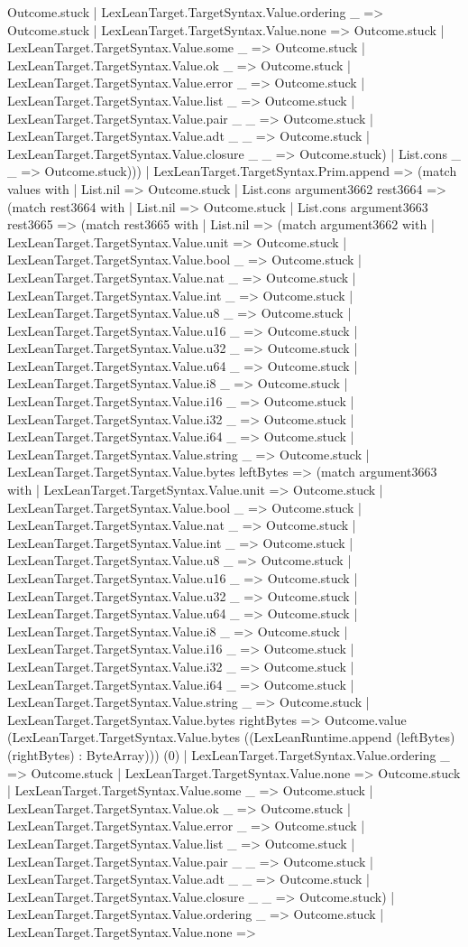 \documentclass[11pt]{article}
\begin{document}
Outcome.stuck | LexLeanTarget.TargetSyntax.Value.ordering \_ => Outcome.stuck | LexLeanTarget.TargetSyntax.Value.none => Outcome.stuck | LexLeanTarget.TargetSyntax.Value.some \_ => Outcome.stuck | LexLeanTarget.TargetSyntax.Value.ok \_ => Outcome.stuck | LexLeanTarget.TargetSyntax.Value.error \_ => Outcome.stuck | LexLeanTarget.TargetSyntax.Value.list \_ => Outcome.stuck | LexLeanTarget.TargetSyntax.Value.pair \_ \_ => Outcome.stuck | LexLeanTarget.TargetSyntax.Value.adt \_ \_ => Outcome.stuck | LexLeanTarget.TargetSyntax.Value.closure \_ \_ => Outcome.stuck) | List.cons \_ \_ => Outcome.stuck))) | LexLeanTarget.TargetSyntax.Prim.append => (match values with | List.nil => Outcome.stuck | List.cons argument3662 rest3664 => (match rest3664 with | List.nil => Outcome.stuck | List.cons argument3663 rest3665 => (match rest3665 with | List.nil => (match argument3662 with | LexLeanTarget.TargetSyntax.Value.unit => Outcome.stuck | LexLeanTarget.TargetSyntax.Value.bool \_ => Outcome.stuck | LexLeanTarget.TargetSyntax.Value.nat \_ => Outcome.stuck | LexLeanTarget.TargetSyntax.Value.int \_ => Outcome.stuck | LexLeanTarget.TargetSyntax.Value.u8 \_ => Outcome.stuck | LexLeanTarget.TargetSyntax.Value.u16 \_ => Outcome.stuck | LexLeanTarget.TargetSyntax.Value.u32 \_ => Outcome.stuck | LexLeanTarget.TargetSyntax.Value.u64 \_ => Outcome.stuck | LexLeanTarget.TargetSyntax.Value.i8 \_ => Outcome.stuck | LexLeanTarget.TargetSyntax.Value.i16 \_ => Outcome.stuck | LexLeanTarget.TargetSyntax.Value.i32 \_ => Outcome.stuck | LexLeanTarget.TargetSyntax.Value.i64 \_ => Outcome.stuck | LexLeanTarget.TargetSyntax.Value.string \_ => Outcome.stuck | LexLeanTarget.TargetSyntax.Value.bytes leftBytes => (match argument3663 with | LexLeanTarget.TargetSyntax.Value.unit => Outcome.stuck | LexLeanTarget.TargetSyntax.Value.bool \_ => Outcome.stuck | LexLeanTarget.TargetSyntax.Value.nat \_ => Outcome.stuck | LexLeanTarget.TargetSyntax.Value.int \_ => Outcome.stuck | LexLeanTarget.TargetSyntax.Value.u8 \_ => Outcome.stuck | LexLeanTarget.TargetSyntax.Value.u16 \_ => Outcome.stuck | LexLeanTarget.TargetSyntax.Value.u32 \_ => Outcome.stuck | LexLeanTarget.TargetSyntax.Value.u64 \_ => Outcome.stuck | LexLeanTarget.TargetSyntax.Value.i8 \_ => Outcome.stuck | LexLeanTarget.TargetSyntax.Value.i16 \_ => Outcome.stuck | LexLeanTarget.TargetSyntax.Value.i32 \_ => Outcome.stuck | LexLeanTarget.TargetSyntax.Value.i64 \_ => Outcome.stuck | LexLeanTarget.TargetSyntax.Value.string \_ => Outcome.stuck | LexLeanTarget.TargetSyntax.Value.bytes rightBytes => Outcome.value (LexLeanTarget.TargetSyntax.Value.bytes ((LexLeanRuntime.append (leftBytes) (rightBytes) : ByteArray))) (0) | LexLeanTarget.TargetSyntax.Value.ordering \_ => Outcome.stuck | LexLeanTarget.TargetSyntax.Value.none => Outcome.stuck | LexLeanTarget.TargetSyntax.Value.some \_ => Outcome.stuck | LexLeanTarget.TargetSyntax.Value.ok \_ => Outcome.stuck | LexLeanTarget.TargetSyntax.Value.error \_ => Outcome.stuck | LexLeanTarget.TargetSyntax.Value.list \_ => Outcome.stuck | LexLeanTarget.TargetSyntax.Value.pair \_ \_ => Outcome.stuck | LexLeanTarget.TargetSyntax.Value.adt \_ \_ => Outcome.stuck | LexLeanTarget.TargetSyntax.Value.closure \_ \_ => Outcome.stuck) | LexLeanTarget.TargetSyntax.Value.ordering \_ => Outcome.stuck | LexLeanTarget.TargetSyntax.Value.none => 
\end{document}
